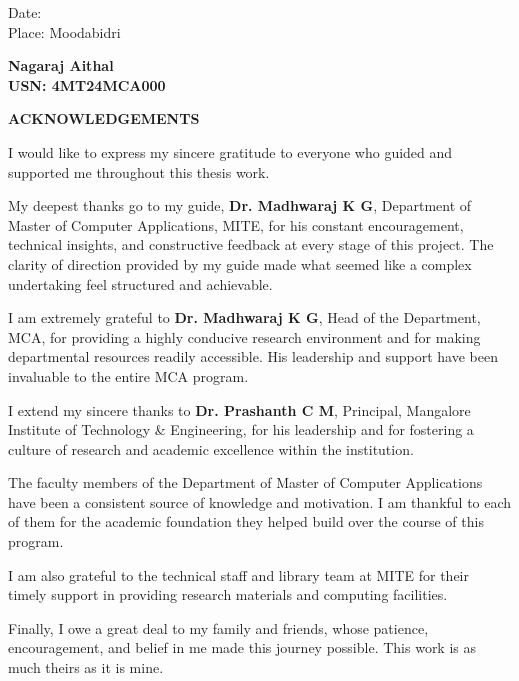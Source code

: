 \vspace{3cm}
\begin{flushleft}
    Date: \\
    Place: Moodabidri
\end{flushleft}
\begin{flushright}
    \vspace{-1.5cm}
    \textbf{Nagaraj Aithal} \\
    \textbf{USN: 4MT24MCA000} \\
\end{flushright}

\newpage

\begin{center}
    \Large{\textbf{ACKNOWLEDGEMENTS}} \\
    \vspace{1.0cm}
\end{center}
I would like to express my sincere gratitude to everyone who guided and supported me throughout this thesis work.

My deepest thanks go to my guide, \textbf{Dr. Madhwaraj K G}, Department of Master of Computer Applications, MITE, for his constant encouragement, technical insights, and constructive feedback at every stage of this project. The clarity of direction provided by my guide made what seemed like a complex undertaking feel structured and achievable.

I am extremely grateful to \textbf{Dr. Madhwaraj K G}, Head of the Department, MCA, for providing a highly conducive research environment and for making departmental resources readily accessible. His leadership and support have been invaluable to the entire MCA program.

I extend my sincere thanks to \textbf{Dr. Prashanth C M}, Principal, Mangalore Institute of Technology \& Engineering, for his leadership and for fostering a culture of research and academic excellence within the institution.

The faculty members of the Department of Master of Computer Applications have been a consistent source of knowledge and motivation. I am thankful to each of them for the academic foundation they helped build over the course of this program.

I am also grateful to the technical staff and library team at MITE for their timely support in providing research materials and computing facilities.

Finally, I owe a great deal to my family and friends, whose patience, encouragement, and belief in me made this journey possible. This work is as much theirs as it is mine.

